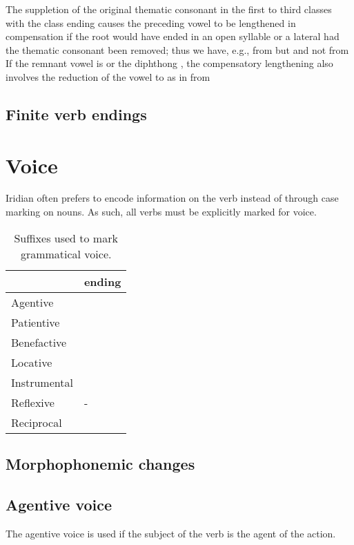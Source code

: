 The suppletion of the original thematic consonant in the first to third classes with the class ending causes the preceding vowel to be lengthened in compensation if the root would have ended in an open syllable or a lateral had the thematic consonant been removed; thus we have, e.g.,  from  but  and not  from  If the remnant vowel is  or the diphthong , the compensatory lengthening also involves the reduction of the vowel to  as in  from 

\subsection{Finite verb endings}

\section{Voice}

Iridian often prefers to encode information on the verb instead of through case marking on nouns. As such, all verbs must be explicitly marked for voice.
\begin{table}[!ht]
	\small
	\caption{Suffixes used to mark grammatical voice.}\medskip
	\begin{tabu} to 0.5\textwidth{YY[0.5]}
		\toprule
		&{\cscaps ending}\\
		\midrule
		Agentive	& \\
		Patientive	& \\ 
		Benefactive	& \\ 
		Locative	& \\ 
		Instrumental& \\ 
		Reflexive	& -\\ 
		Reciprocal	& \\ 
		\bottomrule
	\end{tabu}
\end{table}

\subsection{Morphophonemic changes}


\subsection{Agentive voice}
\par The agentive voice is used if the subject of the verb is the agent of the action.

